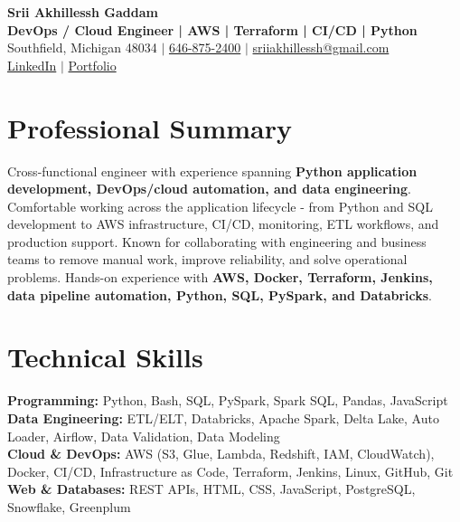 \documentclass[letterpaper,10pt]{article}
\begin{document}
\fontsize{9.35pt}{10.45pt}\selectfont

\begin{center}
    {\LARGE \textbf{Srii Akhillessh Gaddam}} \\[-1pt]
    \textbf{DevOps / Cloud Engineer | AWS | Terraform | CI/CD | Python} \\[2pt]
    Southfield, Michigan 48034 $|$
    \href{tel:6468752400}{646-875-2400} $|$
    \href{mailto:sriiakhillessh@gmail.com}{sriiakhillessh@gmail.com} \\[1pt]
    \href{https://www.linkedin.com/in/srii-akhiilessh-gaddam-b48668191/}{LinkedIn} $|$
    \href{https://sriiakhillesshg.github.io/portfolio/}{Portfolio}
\end{center}
\vspace{-8pt}

\section{Professional Summary}
\small{Cross-functional engineer with experience spanning \textbf{Python application development, DevOps/cloud automation, and data engineering}. Comfortable working across the application lifecycle - from Python and SQL development to AWS infrastructure, CI/CD, monitoring, ETL workflows, and production support. Known for collaborating with engineering and business teams to remove manual work, improve reliability, and solve operational problems. Hands-on experience with \textbf{AWS, Docker, Terraform, Jenkins, data pipeline automation, Python, SQL, PySpark, and Databricks}.}

\section{Technical Skills}
\small{
\textbf{Programming:} Python, Bash, SQL, PySpark, Spark SQL, Pandas, JavaScript \\
\textbf{Data Engineering:} ETL/ELT, Databricks, Apache Spark, Delta Lake, Auto Loader, Airflow, Data Validation, Data Modeling \\
\textbf{Cloud \& DevOps:} AWS (S3, Glue, Lambda, Redshift, IAM, CloudWatch), Docker, CI/CD, Infrastructure as Code, Terraform, Jenkins, Linux, GitHub, Git \\
\textbf{Web \& Databases:} REST APIs, HTML, CSS, JavaScript, PostgreSQL, Snowflake, Greenplum
}
\end{document}
